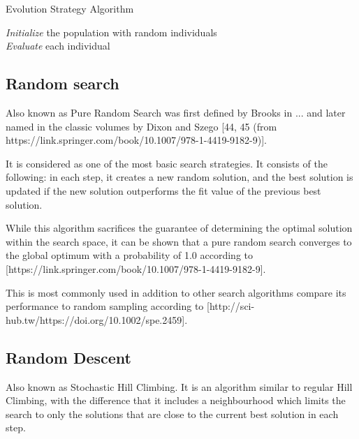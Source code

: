 \begin{algorithm}[H]
\label{evolution_alg}
\caption{Evolution Strategy Algorithm}
\SetAlgoLined
    \textit{Initialize} the population with random individuals\;\\
    \textit{Evaluate} each individual
\end{algorithm}

\subsection{Random search} 

Also known as Pure Random Search was first defined by Brooks in ... 
and later named in the classic volumes by Dixon and Szego [44, 45 (from  https://link.springer.com/book/10.1007/978-1-4419-9182-9)].

It is considered as one of the most basic search strategies. It consists of the following: in each step, it creates a new random solution, and the best solution is updated if the new solution outperforms the fit value of the previous best solution.

While this algorithm sacrifices the guarantee of determining the optimal solution within the search space, it can be shown that a pure random search converges to the global optimum with a probability of 1.0 according to [https://link.springer.com/book/10.1007/978-1-4419-9182-9].

This is most commonly used in addition to other search algorithms compare its performance to random sampling according to [http://sci-hub.tw/https://doi.org/10.1002/spe.2459].

\subsection{Random Descent} 

Also known as Stochastic Hill Climbing. It is an algorithm similar to regular Hill Climbing, with the difference that it includes a neighbourhood which limits the search to only the solutions that are close to the current best solution in each step.

